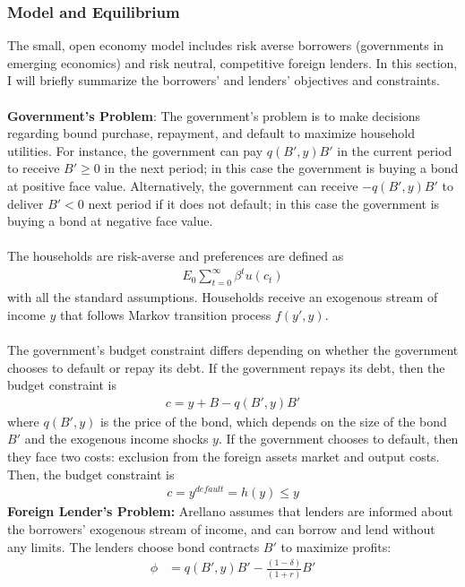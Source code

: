\documentclass[12pt]{article}
\begin{document}
\clearpage
\subsubsection*{Model and Equilibrium}

The small, open economy model includes risk averse borrowers (governments in emerging economics) and risk neutral, competitive foreign lenders. In this section, I will briefly summarize the borrowers' and lenders' objectives and constraints.\\\\
\textbf{Government's Problem}: The government's problem is to make decisions regarding bound purchase, repayment, and default to maximize household utilities. For instance, the government can pay $q(B', y)B'$ in the current period to receive $B' \ge 0$ in the next period; in this case the government is buying a bond at positive face value. Alternatively, the government can receive $-q(B', y)B'$ to deliver $B' < 0$ next period if it does not default; in this case the government is buying a bond at negative face value.\\\\
The households are risk-averse and preferences are defined as
\begin{align*}
  E_0 \sum_{t=0}^{\infty} \beta^t u(c_t)
\end{align*}
with all the standard assumptions. Households receive an exogenous stream of income $y$ that follows Markov transition process $f(y', y)$. \\\\
The government's budget constraint differs depending on whether the government chooses to default or repay its debt. If the government repays its debt, then the budget constraint is
\begin{align*}
    c = y + B - q(B', y)B'
\end{align*}
where $q(B', y)$ is the price of the bond, which depends on the size of the bond $B'$ and the exogenous income shocks $y$. If the government chooses to default, then they face two costs: exclusion from the foreign assets market and output costs. Then, the budget constraint is
\begin{align*}
    c = y^{default} = h(y) \le y
\end{align*}
\textbf{Foreign Lender's Problem: }Arellano assumes that lenders are informed about the borrowers' exogenous stream of income, and can borrow and lend without any limits. The lenders choose bond contracts $B'$ to maximize profits:
\begin{align*}
    \phi &= q(B', y)B' - \frac{(1-\delta)}{(1+r)}B'
\end{align*}
\end{document}
